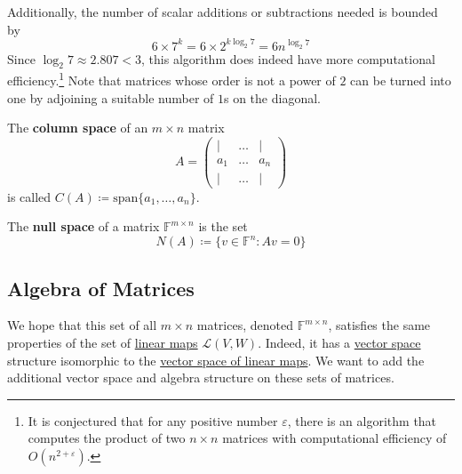\begin{algo}
		Additionally, the number of scalar additions or subtractions needed is bounded by 
		\begin{equation}
			6 \times 7^k = 6 \times 2^{k \log_2{7}} = 6 n^{\log_2{7}}
		\end{equation}
		Since $\log_2{7} \approx 2.807 < 3$, this algorithm does indeed have more computational efficiency.\footnote{It is conjectured that for any positive number $\varepsilon$, there is an algorithm that computes the product of two $n \times n$ matrices with computational efficiency of $O(n^{2 + \varepsilon})$. } Note that matrices whose order is not a power of $2$ can be turned into one by adjoining a suitable number of $1$s on the diagonal.
  \end{algo}

	\begin{definition}
	  \label{def:column-space}
		The \textbf{column space} of an $m \times n$ matrix 
		\begin{equation}
			A = \begin{pmatrix} | & \ldots & | \\ 
				a_1 & \ldots & a_n \\ 
				| & \ldots & |
			\end{pmatrix}
		\end{equation}
		is called $C(A) \coloneqq \mathrm{span}\{a_1, \ldots, a_n\}$. 
	\end{definition}

	\begin{definition}
	  \label{def:null-space}
		The \textbf{null space} of a matrix $\mathbb{F}^{m \times n}$ is the set 
		\begin{equation}
			N(A) \coloneqq \{ v \in \mathbb{F}^n \colon Av = 0 \}
		\end{equation}
	\end{definition}

\subsection{Algebra of Matrices} 

	We hope that this set of all $m \times n$ matrices, denoted $\mathbb{F}^{m \times n}$, satisfies the same properties of the set of \hyperref[def:linear_map]{linear maps} $\mathcal{L}(V, W)$. Indeed, it has a \hyperref[def:vector-space]{vector space} structure isomorphic to the \hyperref[thm:vector-space-of-linear-maps]{vector space of linear maps}. We want to add the additional vector space and algebra structure on these sets of matrices. 

